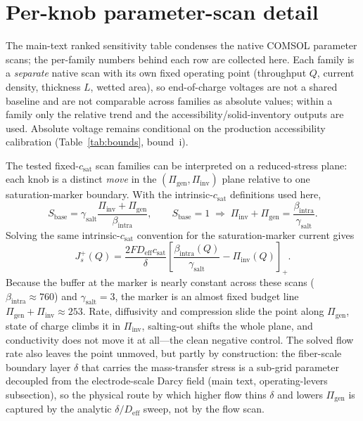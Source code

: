 \documentclass[11pt]{article}
\newcommand{\csat}{c_{\mathrm{sat}}}
\newcommand{\Deff}{D_{\mathrm{eff}}}
\begin{document}
\section{Per-knob parameter-scan detail}\label{sec:si-knobs}
The main-text ranked sensitivity table condenses the native COMSOL parameter scans; the
per-family numbers behind each row are collected here. Each family is a \emph{separate} native scan with its
own fixed operating point (throughput $Q$, current density, thickness $L$, wetted area), so end-of-charge
voltages are not a shared baseline and are not comparable across families as absolute values; within a family
only the relative trend and the accessibility/solid-inventory outputs are used. Absolute voltage remains
conditional on the production accessibility calibration (Table~\ref{tab:bounds}, bound~i).

The tested fixed-$\csat$ scan families can be interpreted on a reduced-stress plane:
each knob is a distinct \emph{move} in the $(\Pi_{\mathrm{gen}},\Pi_{\mathrm{inv}})$ plane relative to one
saturation-marker boundary. With the intrinsic-$\csat$ definitions used here,
\begin{equation}
S_{\mathrm{base}}=\gamma_{\mathrm{salt}}
\frac{\Pi_{\mathrm{inv}}+\Pi_{\mathrm{gen}}}{\beta_{\mathrm{intra}}},
\qquad
S_{\mathrm{base}}=1\;\Longrightarrow\;
\Pi_{\mathrm{inv}}+\Pi_{\mathrm{gen}}=\frac{\beta_{\mathrm{intra}}}{\gamma_{\mathrm{salt}}}.
\label{eq:canonicalstress}
\end{equation}
Solving the same intrinsic-$\csat$ convention for the saturation-marker current gives
\begin{equation}
J_s^{+}(Q)=\frac{2F\Deff\csat}{\delta}
\left[\frac{\beta_{\mathrm{intra}}(Q)}{\gamma_{\mathrm{salt}}}
-\Pi_{\mathrm{inv}}(Q)\right]_{+}.
\label{eq:canonicaljs}
\end{equation}
Because the buffer at the marker is nearly constant across these scans
($\beta_{\mathrm{intra}}\approx760$) and $\gamma_{\mathrm{salt}}=3$, the marker is an almost fixed budget line
$\Pi_{\mathrm{gen}}+\Pi_{\mathrm{inv}}\approx253$. Rate, diffusivity and compression slide the point along
$\Pi_{\mathrm{gen}}$, state of charge climbs it in $\Pi_{\mathrm{inv}}$, salting-out shifts the whole plane,
and conductivity does not move it at all---the clean negative control. The solved flow rate also leaves the
point unmoved, but partly by construction: the fiber-scale boundary layer $\delta$ that carries the
mass-transfer stress is a sub-grid parameter decoupled from the electrode-scale Darcy field (main text,
operating-levers subsection), so the physical route by which higher flow thins $\delta$ and lowers
$\Pi_{\mathrm{gen}}$ is captured by the analytic $\delta/\Deff$ sweep, not by the flow scan.
\end{document}
